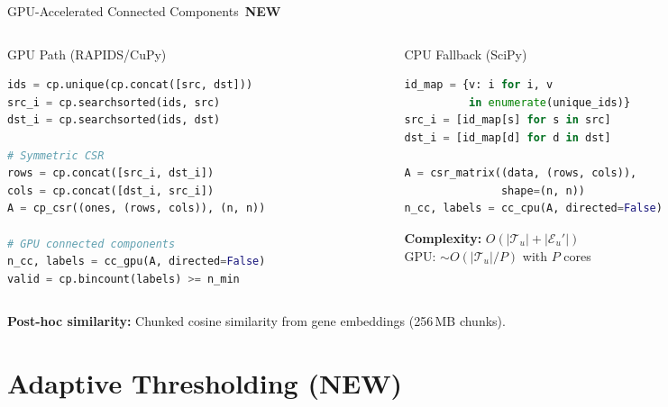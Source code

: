 \documentclass[aspectratio=169,10pt]{beamer}
\newcommand{\edges}{\mathcal{E}}
\newcommand{\Tcal}{\mathcal{T}}
\newcommand{\NEW}{\,{\scriptsize\colorbox{newgreen}{\color{white}\textbf{NEW}}}\,}
\begin{document}
\begin{frame}[fragile]{GPU-Accelerated Connected Components \NEW}

\begin{columns}[T]
\begin{column}{0.48\textwidth}
\begin{block}{GPU Path (RAPIDS/CuPy)}
\begin{lstlisting}[language=Python]
ids = cp.unique(cp.concat([src, dst]))
src_i = cp.searchsorted(ids, src)
dst_i = cp.searchsorted(ids, dst)

# Symmetric CSR
rows = cp.concat([src_i, dst_i])
cols = cp.concat([dst_i, src_i])
A = cp_csr((ones, (rows, cols)), (n, n))

# GPU connected components
n_cc, labels = cc_gpu(A, directed=False)
valid = cp.bincount(labels) >= n_min
\end{lstlisting}
\end{block}
\end{column}

\begin{column}{0.48\textwidth}
\begin{block}{CPU Fallback (SciPy)}
\begin{lstlisting}[language=Python]
id_map = {v: i for i, v
          in enumerate(unique_ids)}
src_i = [id_map[s] for s in src]
dst_i = [id_map[d] for d in dst]

A = csr_matrix((data, (rows, cols)),
               shape=(n, n))
n_cc, labels = cc_cpu(A, directed=False)
\end{lstlisting}
\end{block}

\vspace{0.1cm}
{\small\textbf{Complexity:} $O(|\Tcal_u| + |\edges_u'|)$ \\
GPU: $\sim O(|\Tcal_u|/P)$ with $P$ cores}
\end{column}
\end{columns}

\vspace{0.1cm}
{\footnotesize\textbf{Post-hoc similarity:} Chunked cosine similarity from gene embeddings (256\,MB chunks).}
\end{frame}

\section{Adaptive Thresholding (NEW)}
\end{document}
